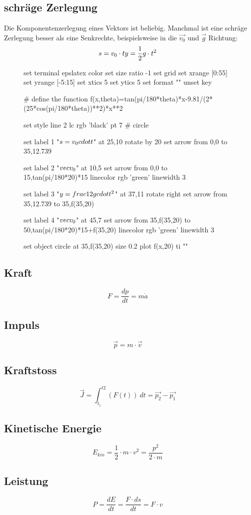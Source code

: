 \subsection{schräge Zerlegung}
Die Komponentenzerlegung eines Vektors ist beliebig. Manchmal ist eine schräge Zerlegung besser als eine Senkrechte,
beispielsweise in die $\vec{v_0}$ und $\vec{g}$ Richtung:
\newline
\[
	s=v_0 \cdot t \\
	y=\frac{1}{2}g \cdot t^2
\]
\begin{figure}[htbp]
\centering
\begin{gnuplot}[scale=0.75]
	set terminal epslatex color
	set size ratio -1
	set grid
  set xrange [0:55]
	set yrange [-5:15]
	set xtics 5
	set ytics 5
	set format ""
	unset key

  # define the function
  f(x,theta)=tan(pi/180*theta)*x-9.81/(2*(25*cos(pi/180*theta))**2)*x**2

	set style line 2 lc rgb 'black' pt 7   # circle
	
	set label 1 "$s=v_0 \\cdot t$" at 25,10 rotate by 20
	set arrow from 0,0 to 35,12.739
	
	set label 2 "$\\vec{v_0}$" at 10,5
	set arrow from 0,0 to 15,tan(pi/180*20)*15 linecolor rgb 'green' linewidth 3
	
	set label 3 "$y=\\frac{1}{2}g \\cdot t^2$" at 37,11 rotate right
	set arrow from 35,12.739 to 35,f(35,20)
	
	set label 4 "$\\vec{v_0}$" at 45,7
	set arrow from 35,f(35,20) to 50,tan(pi/180*20)*15+f(35,20) linecolor rgb 'green' linewidth 3
	
	set object circle at 35,f(35,20) size 0.2
  plot f(x,20) ti ""
	\end{gnuplot}
\end{figure}

\subsection{Kraft}
\[ F = \frac{dp}{dt} = m \dot a \]

\subsection{Impuls}
\[ \vec{p} = m \cdot \vec{v} \]

\subsection{Kraftstoss}
\[ \vec{J} = \int_{t_1}^{t2} (F(t)) ~ dt = \vec{p_2} - \vec{p_1} \]

\subsection{Kinetische Energie}
\[ E_{kin} = \frac{1}{2} \cdot m \cdot v^2 = \frac{p^2}{2 \cdot m} \]

\subsection{Leistung}
\[ P = \frac{dE}{dt} = \frac{F \cdot ds}{dt} = F \cdot v \]

